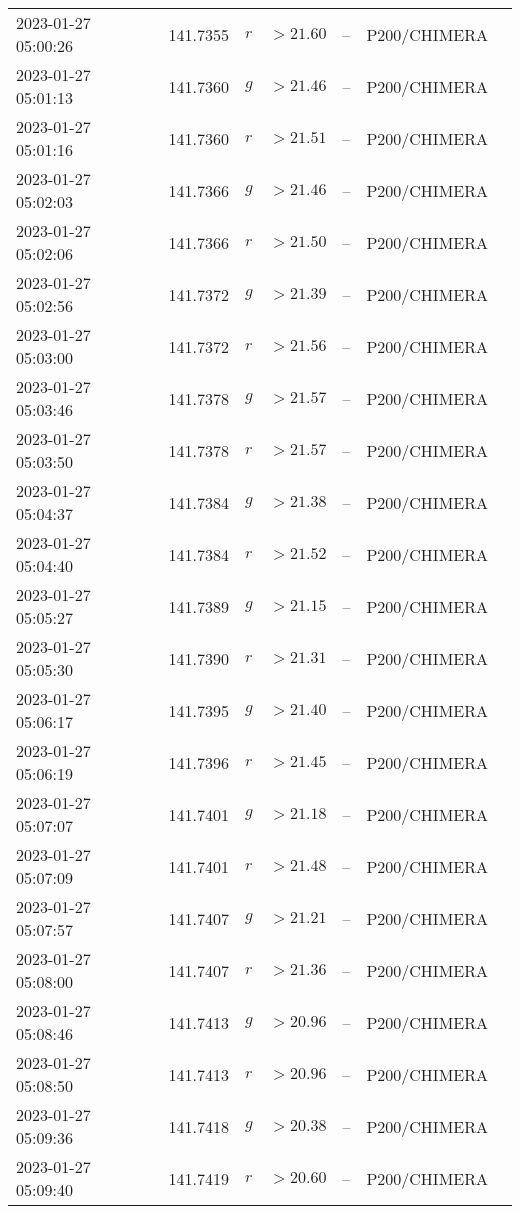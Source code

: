 \documentclass{nature_plusfigure}
\begin{document}
\begin{supplement}
\begin{center}
\begin{longtable}{lllllll}
2023-01-27 05:00:26 & 141.7355 & $r$ & $>21.60$ & -- & P200/CHIMERA &  \\ 
2023-01-27 05:01:13 & 141.7360 & $g$ & $>21.46$ & -- & P200/CHIMERA &  \\ 
2023-01-27 05:01:16 & 141.7360 & $r$ & $>21.51$ & -- & P200/CHIMERA &  \\ 
2023-01-27 05:02:03 & 141.7366 & $g$ & $>21.46$ & -- & P200/CHIMERA &  \\ 
2023-01-27 05:02:06 & 141.7366 & $r$ & $>21.50$ & -- & P200/CHIMERA &  \\ 
2023-01-27 05:02:56 & 141.7372 & $g$ & $>21.39$ & -- & P200/CHIMERA &  \\ 
2023-01-27 05:03:00 & 141.7372 & $r$ & $>21.56$ & -- & P200/CHIMERA &  \\ 
2023-01-27 05:03:46 & 141.7378 & $g$ & $>21.57$ & -- & P200/CHIMERA &  \\ 
2023-01-27 05:03:50 & 141.7378 & $r$ & $>21.57$ & -- & P200/CHIMERA &  \\ 
2023-01-27 05:04:37 & 141.7384 & $g$ & $>21.38$ & -- & P200/CHIMERA &  \\ 
2023-01-27 05:04:40 & 141.7384 & $r$ & $>21.52$ & -- & P200/CHIMERA &  \\ 
2023-01-27 05:05:27 & 141.7389 & $g$ & $>21.15$ & -- & P200/CHIMERA &  \\ 
2023-01-27 05:05:30 & 141.7390 & $r$ & $>21.31$ & -- & P200/CHIMERA &  \\ 
2023-01-27 05:06:17 & 141.7395 & $g$ & $>21.40$ & -- & P200/CHIMERA &  \\ 
2023-01-27 05:06:19 & 141.7396 & $r$ & $>21.45$ & -- & P200/CHIMERA &  \\ 
2023-01-27 05:07:07 & 141.7401 & $g$ & $>21.18$ & -- & P200/CHIMERA &  \\ 
2023-01-27 05:07:09 & 141.7401 & $r$ & $>21.48$ & -- & P200/CHIMERA &  \\ 
2023-01-27 05:07:57 & 141.7407 & $g$ & $>21.21$ & -- & P200/CHIMERA &  \\ 
2023-01-27 05:08:00 & 141.7407 & $r$ & $>21.36$ & -- & P200/CHIMERA &  \\ 
2023-01-27 05:08:46 & 141.7413 & $g$ & $>20.96$ & -- & P200/CHIMERA &  \\ 
2023-01-27 05:08:50 & 141.7413 & $r$ & $>20.96$ & -- & P200/CHIMERA &  \\ 
2023-01-27 05:09:36 & 141.7418 & $g$ & $>20.38$ & -- & P200/CHIMERA &  \\ 
2023-01-27 05:09:40 & 141.7419 & $r$ & $>20.60$ & -- & P200/CHIMERA &  \\ 

\end{longtable}
\end{center}
\end{supplement}
\end{document}
